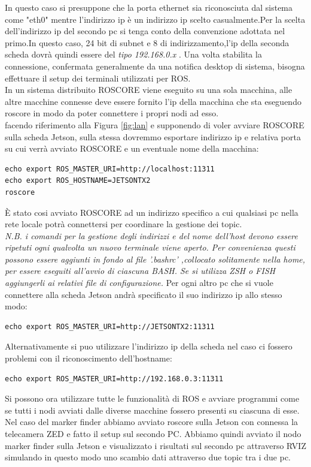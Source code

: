 \documentclass[a4paper]{article}
\begin{document}
In questo caso si presuppone che la porta ethernet sia riconosciuta dal sistema come "eth0" mentre l'indirizzo ip è un indirizzo ip scelto casualmente.Per la scelta dell'indirizzo ip del secondo pc si tenga conto della convenzione adottata nel primo.In questo caso, 24 bit di subnet e 8 di indirizzamento,l'ip della seconda scheda dovrà quindi essere del \textit{tipo 192.168.0.x} .
Una volta stabilita la connessione, confermata generalmente da una notifica desktop di sistema, bisogna effettuare il setup dei terminali utilizzati per ROS.\\
In un sistema distribuito ROSCORE viene eseguito su una sola macchina, alle altre macchine connesse deve essere fornito l'ip della macchina che sta eseguendo roscore in modo da poter connettere i propri nodi ad esso.\\
facendo riferimento alla Figura \ref{fig:lan} e supponendo di voler avviare ROSCORE sulla scheda Jetson, sulla stessa dovremmo esportare indirizzo ip e relativa porta su cui verrà avviato ROSCORE e un eventuale nome della macchina:
\begin{verbatim}
echo export ROS_MASTER_URI=http://localhost:11311 
echo export ROS_HOSTNAME=JETSONTX2
roscore
\end{verbatim}
È stato cosi avviato ROSCORE ad un indirizzo specifico a cui qualsiasi pc nella rete locale potrà connettersi per coordinare la gestione dei topic.\\
\textit{
N.B. i comandi per la gestione degli indirizzi e del nome dell'host devono essere ripetuti ogni qualvolta un nuovo terminale viene aperto. Per convenienza questi possono essere aggiunti in fondo al file '.bashrc' ,collocato solitamente nella home, per essere eseguiti all'avvio di ciascuna BASH. Se si utilizza ZSH o FISH aggiungerli ai relativi file di configurazione. 
}
Per ogni altro pc che si vuole connettere alla scheda Jetson andrà specificato il suo indirizzo ip allo stesso modo:
\begin{verbatim}
echo export ROS_MASTER_URI=http://JETSONTX2:11311
\end{verbatim}
Alternativamente si puo utilizzare l'indirizzo ip della scheda nel caso ci fossero problemi con il riconoscimento dell'hostname:
\begin{verbatim}
echo export ROS_MASTER_URI=http://192.168.0.3:11311
\end{verbatim}
Si possono ora utilizzare tutte le funzionalità di ROS e avviare programmi come se tutti i nodi avviati dalle diverse macchine fossero presenti su ciascuna di esse.
Nel caso del marker finder abbiamo avviato roscore sulla Jetson con connessa la telecamera ZED e fatto il setup sul secondo PC.
Abbiamo quindi avviato il nodo marker finder sulla Jetson e visualizzato i risultati sul secondo pc attraverso RVIZ simulando in questo modo uno scambio dati attraverso due topic tra i due pc.
\end{document}
